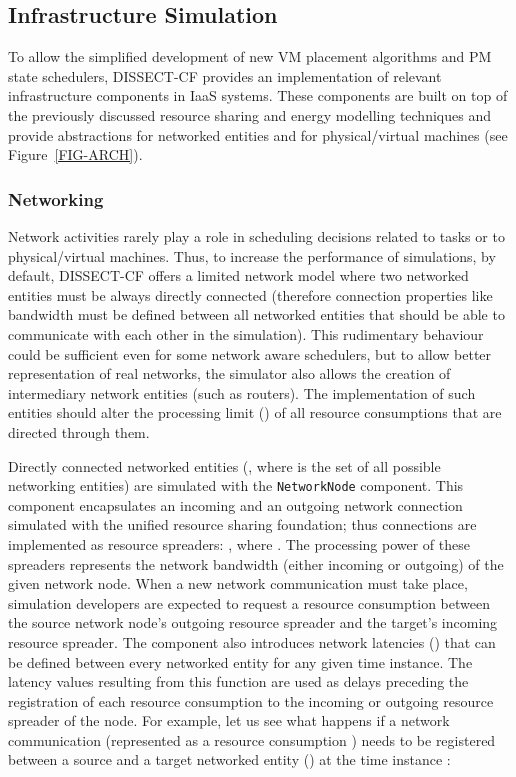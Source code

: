 \documentclass[sort, compress, 5p]{elsarticle}
\begin{document}
\subsection{Infrastructure Simulation}

To allow the simplified development of new VM placement algorithms and PM state schedulers, DISSECT-CF provides an implementation of relevant infrastructure components in IaaS systems. These components are built on top of the previously discussed resource sharing and energy modelling techniques and provide abstractions for networked entities and for physical/virtual machines (see Figure~\ref{FIG-ARCH}). 

\subsubsection{Networking} \label{Sec-NW}
Network activities rarely play a role in scheduling decisions related to tasks or to physical/virtual machines. Thus, to increase the performance of simulations, by default, DISSECT-CF offers a limited network model where two networked entities must be always directly connected (therefore connection properties like bandwidth must be defined between all networked entities that should be able to communicate with each other in the simulation). This rudimentary behaviour could be sufficient even for some network aware schedulers, but to allow better representation of real networks, the simulator also allows the creation of intermediary network entities (such as routers). The implementation of such entities should alter the processing limit () of all resource consumptions that are directed through them.

Directly connected networked entities (, where  is the set of all possible networking entities) are simulated with the \verb+NetworkNode+ component. This component encapsulates an incoming and an outgoing network connection simulated with the unified resource sharing foundation; thus connections are implemented as resource spreaders: , where . The processing power of these spreaders represents the network bandwidth (either incoming or outgoing) of the given network node. When a new network communication must take place, simulation developers are expected to request a resource consumption between the source network node's outgoing resource spreader and the target's incoming resource spreader. The component also introduces network latencies () that can be defined between every networked entity for any given time instance. The latency values resulting from this function are used as delays preceding the registration of each resource consumption to the incoming or outgoing resource spreader of the node. For example, let us see what happens if a network communication (represented as a resource consumption ) needs to be registered between a source and a target networked entity ()  at the time instance :
\end{document}
